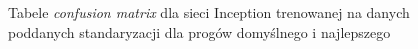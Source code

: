 \documentclass[polish,12pt]{aghthesis}
\begin{document}
\begin{figure}[H]
    \begin{adjustbox}{minipage=1.0\paperwidth, pagecenter}
    \centering
    \qquad
    \end{adjustbox}
    \label{fig:inc-sth-thresh-matrices}
    \caption{Tabele \textit{confusion matrix} dla sieci Inception trenowanej na danych poddanych standaryzacji dla progów domyślnego i najlepszego}
\end{figure}
\end{document}
